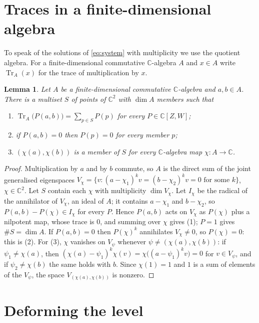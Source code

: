\documentclass[11pt]{amsart}
\newtheorem{lemma}[theorem]{Lemma}
\theoremstyle{remark}\newtheorem{remark}[theorem]{Remark}
\theoremstyle{definition}\newtheorem{example}[theorem]{Example}
\newcommand{\C}{\mathbb{C}}
\newcommand{\Tr}{\operatorname{Tr}}
\begin{document}
\section{Traces in a finite-dimensional algebra}\label{sec:trace}

To speak of the solutions of \eqref{eq:system} with multiplicity we use the quotient algebra. For a
finite-dimensional commutative $\C$-algebra $A$ and $x\in A$ write $\Tr_A(x)$ for the trace of multiplication by $x$.

\begin{lemma}\label{lem:trace}
Let $A$ be a finite-dimensional commutative $\C$-algebra and $a,b\in A$. There is a multiset $S$ of points of
$\C^2$ with $\dim A$ members such that
\begin{enumerate}
\item $\Tr_A\bigl(P(a,b)\bigr)=\sum_{p\in S}P(p)$ for every $P\in\C[Z,W]$;
\item if $P(a,b)=0$ then $P(p)=0$ for every member $p$;
\item $(\chi(a),\chi(b))$ is a member of $S$ for every $\C$-algebra map $\chi\colon A\to\C$.
\end{enumerate}
\end{lemma}

\begin{proof}
Multiplication by $a$ and by $b$ commute, so $A$ is the direct sum of the joint generalised eigenspaces
$V_\chi=\{v:(a-\chi_1)^kv=(b-\chi_2)^kv=0\text{ for some }k\}$, $\chi\in\C^2$. Let $S$ contain each $\chi$ with
multiplicity $\dim V_\chi$. Let $I_\chi$ be the radical of the annihilator of $V_\chi$, an ideal of $A$; it
contains $a-\chi_1$ and $b-\chi_2$, so $P(a,b)-P(\chi)\in I_\chi$ for every $P$. Hence $P(a,b)$ acts on $V_\chi$ as
$P(\chi)$ plus a nilpotent map, whose trace is $0$, and summing over $\chi$ gives (1); $P=1$ gives $\#S=\dim A$. If
$P(a,b)=0$ then $P(\chi)^k$ annihilates $V_\chi\ne0$, so $P(\chi)=0$: this is (2). For (3), $\chi$ vanishes on
$V_\psi$ whenever $\psi\ne(\chi(a),\chi(b))$: if $\psi_1\ne\chi(a)$, then
$(\chi(a)-\psi_1)^k\chi(v)=\chi\bigl((a-\psi_1)^kv\bigr)=0$ for $v\in V_\psi$, and if $\psi_2\ne\chi(b)$ the same holds
with $b$. Since $\chi(1)=1$ and $1$ is a sum of elements of the $V_\psi$, the space $V_{(\chi(a),\chi(b))}$ is nonzero.
\end{proof}

\section{Deforming the level}\label{sec:deform}
\end{document}
